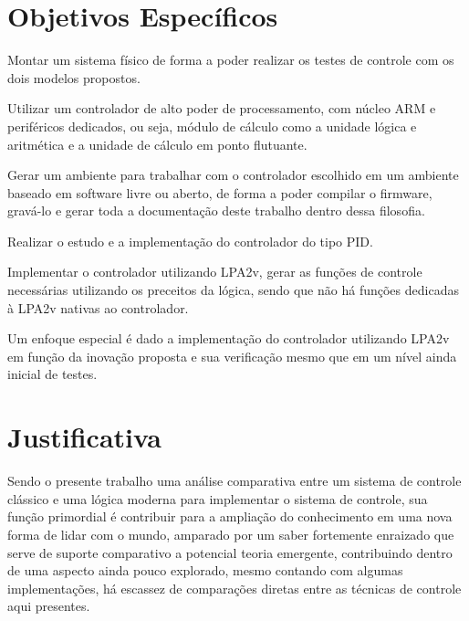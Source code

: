 \section{Objetivos Específicos}

Montar um sistema físico de forma a poder realizar os testes 
de controle com os dois modelos propostos.

Utilizar um controlador de alto poder de processamento, 
com núcleo ARM e periféricos dedicados, ou seja, 
módulo de cálculo como a unidade lógica e aritmética e 
a unidade de cálculo em ponto flutuante.

Gerar um ambiente para trabalhar com o controlador escolhido em um ambiente baseado em software livre ou aberto, de forma a poder compilar o firmware, gravá-lo e gerar toda a documentação deste trabalho dentro dessa filosofia.

Realizar o estudo e a implementação do controlador do tipo PID.

Implementar o controlador utilizando LPA2v, 
gerar as funções de controle necessárias utilizando os preceitos da lógica, 
sendo que não há funções dedicadas à LPA2v nativas ao controlador.

Um enfoque especial é dado a implementação do controlador utilizando LPA2v 
em função da inovação proposta e 
sua verificação mesmo que em um nível ainda inicial de testes.



\section{Justificativa}

Sendo o presente trabalho uma 
análise comparativa entre 
um sistema de controle clássico e 
uma lógica moderna para implementar o sistema de controle, 
sua função primordial é 
contribuir para a ampliação do conhecimento em 
uma nova forma de lidar com o mundo, 
amparado por um saber fortemente enraizado que 
serve de suporte comparativo a potencial teoria emergente, 
contribuindo dentro de uma aspecto ainda pouco explorado, 
mesmo contando com algumas implementações, 
há escassez de comparações diretas entre 
as técnicas de controle aqui presentes.



